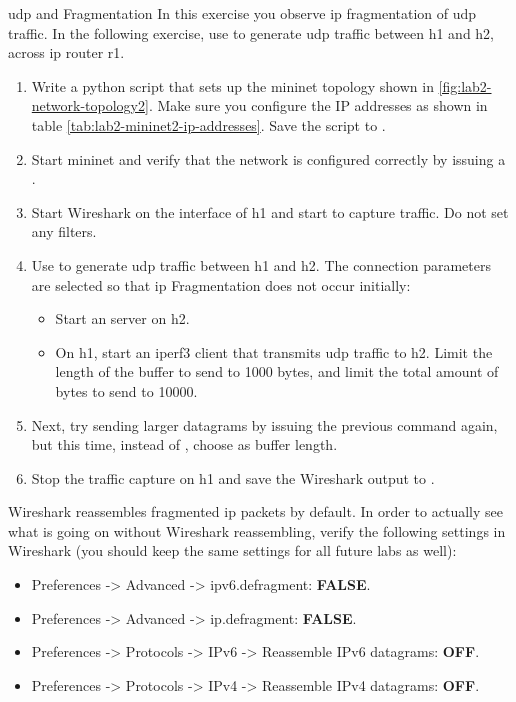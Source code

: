 \begin{exercise}{\ac{udp} and Fragmentation}
In this exercise you observe \acs{ip} fragmentation of \ac{udp} traffic. In the following exercise, use  to generate \ac{udp} traffic between h1 and h2, across \acs{ip} router r1.

\begin{enumerate}
	\item Write a python script that sets up the mininet topology shown in \ref{fig:lab2-network-topology2}. Make sure you configure the IP addresses as shown in table \ref{tab:lab2-mininet2-ip-addresses}. Save the script to .
	\item Start mininet and verify that the network is configured correctly by issuing a .
	\item Start Wireshark on the  interface of h1 and start to capture traffic. Do not set any filters.
	\item Use  to generate \ac{udp} traffic between h1 and h2. The connection parameters are selected so that \acs{ip} Fragmentation does not occur initially:
	\begin{itemize}
		\item Start an  server on h2.
		\item On h1, start an iperf3 client that transmits \ac{udp} traffic to h2. Limit the length of the buffer to send to 1000 bytes, and limit the total amount of bytes to send to 10000.
	\end{itemize}
	\item Next, try sending larger datagrams by issuing the previous  command again, but this time, instead of , choose  as buffer length.
	\item Stop the traffic capture on h1 and save the Wireshark output to .
\end{enumerate}

\remark Wireshark reassembles fragmented \ac{ip} packets by default. In order to actually see what is going on without Wireshark reassembling, verify the following settings in Wireshark (you should keep the same settings for all future labs as well):
\begin{itemize}
	\item Preferences -> Advanced -> ipv6.defragment: \textbf{FALSE}.
	\item Preferences -> Advanced -> ip.defragment: \textbf{FALSE}.
	\item Preferences -> Protocols -> IPv6 -> Reassemble IPv6 datagrams: \textbf{OFF}.
	\item Preferences -> Protocols -> IPv4 -> Reassemble IPv4 datagrams: \textbf{OFF}.
\end{itemize}


\end{exercise}
